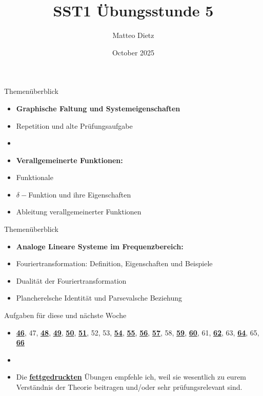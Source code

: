 \documentclass[14pt, aspectratio=169, handout]{beamer}
\title{SST1 Übungsstunde 5}
\author{Matteo Dietz}
\date{October 2025}
\begin{document}
\maketitle


\begin{frame}{Themenüberblick}
    \begin{itemize}
    \item \textbf{Graphische Faltung und Systemeigenschaften}
    \item[] Repetition und alte Prüfungsaufgabe
    \item[] 
    \item \textbf{Verallgemeinerte Funktionen:}
    \item[] Funktionale
    \item[] $\delta-$Funktion und ihre Eigenschaften
    \item[] Ableitung verallgemeinerter Funktionen
    \end{itemize}
\end{frame}

\begin{frame}{Themenüberblick}
    \begin{itemize}
        \item \textbf{Analoge Lineare Systeme im Frequenzbereich:}
    \item[] Fouriertransformation: Definition, Eigenschaften und Beispiele
    \item[] Dualität der Fouriertransformation
    \item[] Plancherelsche Identität und Parsevalsche Beziehung
    \end{itemize}
\end{frame}

\begin{frame}{Aufgaben für diese und nächste Woche}
    \begin{itemize}
        \item[] \underline{\textbf{46}}, 47, \underline{\textbf{48}}, \underline{\textbf{49}}, \underline{\textbf{50}}, \underline{\textbf{51}}, 52, 53, \underline{\textbf{54}}, \underline{\textbf{55}}, \underline{\textbf{56}}, \underline{\textbf{57}}, 58, \underline{\textbf{59}}, \underline{\textbf{60}}, 61, \underline{\textbf{62}}, 63, \underline{\textbf{64}}, 65, \underline{\textbf{66}}
        \item[] 
        \item[] Die \underline{\textbf{fettgedruckten}} Übungen empfehle ich, weil sie wesentlich zu eurem Verständnis der Theorie beitragen und/oder sehr prüfungsrelevant sind.
    \end{itemize}
\end{frame}
\end{document}
